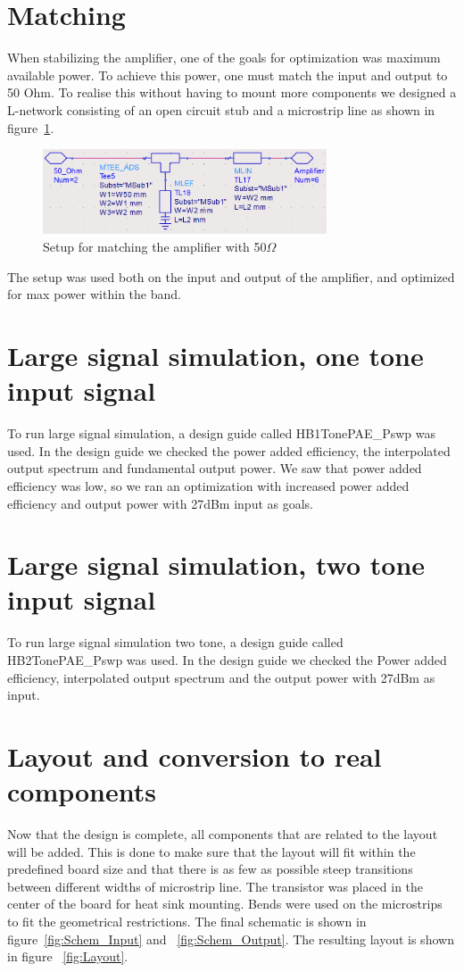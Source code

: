   \section{Matching}
  When stabilizing the amplifier, one of the goals for optimization was maximum available power. To achieve this power, one must match the input and output to 50 Ohm. To realise this without having to mount more components we designed a L-network consisting of an open circuit stub and a microstrip line as shown in figure~\ref{fig:fig_match_net}.
  \begin{figure}[h]
	\centering
	\includegraphics[width=0.75\textwidth]{img/Matching_network}
	\caption{Setup for matching the amplifier with 50$\Omega$}
	\label{fig:fig_match_net}
  \end{figure}
  The setup was used both on the input and output of the amplifier, and optimized for max power within the band.
  
  \section{Large signal simulation, one tone input signal}
  To run large signal simulation, a design guide called HB1TonePAE\_Pswp was used. In the design guide we checked the power added efficiency, the interpolated output spectrum and fundamental output power. We saw that power added efficiency was low, so we ran an optimization with increased power added efficiency and output power with 27dBm input as goals.
  
  \section{Large signal simulation, two tone input signal}
  To run large signal simulation two tone, a design guide called HB2TonePAE\_Pswp was used. In the design guide we checked the Power added efficiency, interpolated output spectrum and the output power with 27dBm as input. 
  
  \section{Layout and conversion to real components}
  Now that the design is complete, all components that are related to the layout will be added. This is done to make sure that the layout will fit within the predefined board size and that there is as few as possible steep transitions between different widths of microstrip line. The transistor was placed in the center of the board for heat sink mounting. Bends were used on the microstrips to fit the geometrical restrictions. The final schematic is shown in figure~\ref{fig:Schem_Input} and ~\ref{fig:Schem_Output}. The resulting layout is shown in figure ~\ref{fig:Layout}.
  
